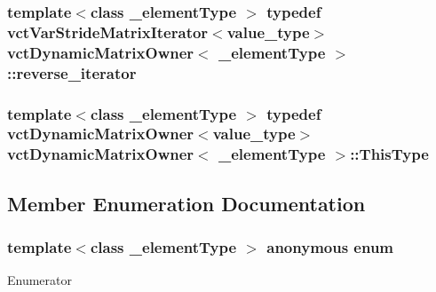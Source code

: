 \hypertarget{classvct_dynamic_matrix_owner_afa1149b71fe5f3151ee890e65ea7e81b}{
\subsubsection[{reverse\-\_\-iterator}]{\setlength{\rightskip}{0pt plus 5cm}template$<$class \-\_\-element\-Type $>$ typedef {\bf vct\-Var\-Stride\-Matrix\-Iterator}$<$value\-\_\-type$>$ {\bf vct\-Dynamic\-Matrix\-Owner}$<$ \-\_\-element\-Type $>$\-::{\bf reverse\-\_\-iterator}}}\label{classvct_dynamic_matrix_owner_afa1149b71fe5f3151ee890e65ea7e81b}
\hypertarget{classvct_dynamic_matrix_owner_a6e693f28f71b3e0b7f5c62d334f99779}{
\subsubsection[{This\-Type}]{\setlength{\rightskip}{0pt plus 5cm}template$<$class \-\_\-element\-Type $>$ typedef {\bf vct\-Dynamic\-Matrix\-Owner}$<$value\-\_\-type$>$ {\bf vct\-Dynamic\-Matrix\-Owner}$<$ \-\_\-element\-Type $>$\-::{\bf This\-Type}}}\label{classvct_dynamic_matrix_owner_a6e693f28f71b3e0b7f5c62d334f99779}


\subsection{Member Enumeration Documentation}
\hypertarget{classvct_dynamic_matrix_owner_ab539c6209377e71938f3be5a0f73aa90}{\subsubsection[{anonymous enum}]{\setlength{\rightskip}{0pt plus 5cm}template$<$class \-\_\-element\-Type $>$ anonymous enum}}\label{classvct_dynamic_matrix_owner_ab539c6209377e71938f3be5a0f73aa90}
\begin{Desc}
\item[Enumerator]\par
\begin{description}
\item[{\em 
\hypertarget{classvct_dynamic_matrix_owner_ab539c6209377e71938f3be5a0f73aa90a3cbd1d8cbd91b8e603c01551869fb839}{D\-I\-M\-E\-N\-S\-I\-O\-N}\label{classvct_dynamic_matrix_owner_ab539c6209377e71938f3be5a0f73aa90a3cbd1d8cbd91b8e603c01551869fb839}
}]\end{description}
\end{Desc}


